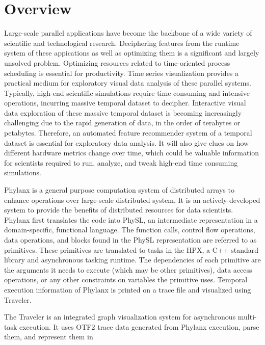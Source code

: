 \section{Overview}
\label{sec:overview}
Large-scale parallel applications have become the backbone of a wide variety of scientific and technological research\cite{ashby2010opportunities,
hoisie2012ascr}. Deciphering features from the runtime system of these appications as well as optimizing them is a significant and largely unsolved problem\cite{daly2011tools}. Optimizing resources related to time-oriented process scheduling is essential for productivity. Time series visualization provides a
practical medium for exploratory visual data analysis of these parallel systems\cite{aigner2011visualization}. Typically, high-end scientific
simulations require time consuming and intensive operations, incurring massive temporal dataset to decipher. Interactive visual data exploration
of these massive temporal dataset is becoming increasingly challenging due to the rapid generation of data, in the order of terabytes or petabytes.
Therefore, an automated feature recommender system of a temporal dataset is essential for exploratory data analysis. It will also give clues on how different
hardware metrics change over time, which could be valuable information for scientists required to run, analyze, and tweak high-end time consuming simulations.
\par
Phylanx\cite{tohid2018asynchronous} is a general purpose computation system of distributed arrays to enhance operations over large-scale distributed system. It
is an actively-developed system to provide the benefits of distributed resources for data scientists. Phylanx first translates the code into PhySL, an intermediate
representation in a domain-specific, functional language. The function calls, control flow operations, data operations, and blocks found in the PhySL
representation are referred to as primitives. These primitives are translated to tasks in the HPX, a C++ standard library and asynchronous tasking runtime.
The dependencies of each primitive are the arguments it needs to execute (which may be other primitives), data access operations, or any other constraints on
variables the primitive uses. Temporal execution information of Phylanx is printed on a trace file and visualized using Traveler.
\par
The Traveler \cite{Traveler2019} is an integrated graph visualization system for asynchronous multi-task execution. It uses
OTF2\cite{otf2_developer_community_2019_3356709} \cite{knupfer2012score} trace data generated from Phylanx execution, parse them, and represent them in
